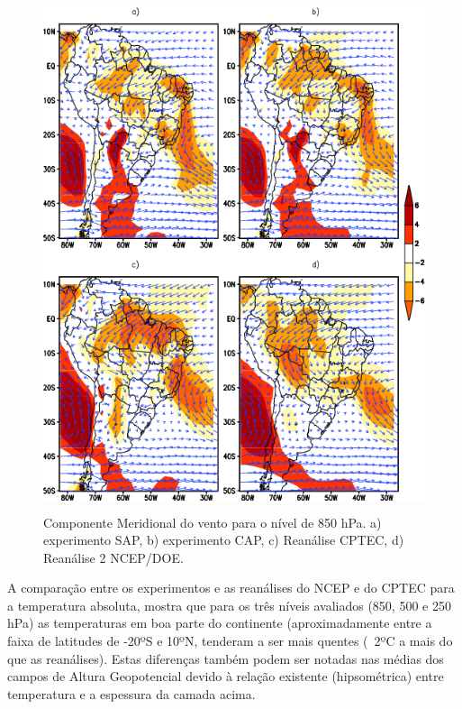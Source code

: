 \begin{figure}[!hbp]
\centering
\includegraphics[height=15cm]{./figs/media_vento-meridional_anl_850hPa.png}
\caption{Componente Meridional do vento para o nível de 850 hPa. a) experimento SAP, b) experimento CAP, c) Reanálise CPTEC, d) Reanálise 2 NCEP/DOE.}
\label{fig38}
\end{figure}

A comparação entre os experimentos e as reanálises do NCEP e do CPTEC para a temperatura absoluta, mostra que para os três níveis avaliados (850, 500 e 250 hPa) as temperaturas em boa parte do continente (aproximadamente entre a faixa de latitudes de -20ºS e 10ºN, tenderam a ser mais quentes (~2ºC a mais do que as reanálises). Estas diferenças também podem ser notadas nas médias dos campos de Altura Geopotencial devido à relação existente (hipsométrica) entre temperatura e a espessura da camada acima.


